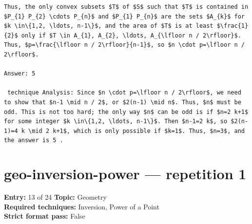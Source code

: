 \documentclass[11pt]{article}
\begin{document}
\begin{lstlisting}[style=modeloutput]
Thus, the only convex subsets $T$ of $S$ such that $T$ is contained in $P_{1} P_{2} \cdots P_{n}$ and $P_{1} P_{n}$ are the sets $A_{k}$ for $k \in\{1,2, \ldots, n-1\}$, and the area of $T$ is at least $\frac{1}{2}$ only if $T \in A_{1}, A_{2}, \ldots, A_{\lfloor n / 2\rfloor}$. Thus, $p=\frac{\lfloor n / 2\rfloor}{n-1}$, so $n \cdot p=\lfloor n / 2\rfloor$.

Answer: 5

 technique Analysis: Since $n \cdot p=\lfloor n / 2\rfloor$, we need to show that $n-1 \mid n / 2$, or $2(n-1) \mid n$. Thus, $n$ must be odd. This is not too hard; the only way $n$ can be odd is if $n=2 k+1$ for some integer $k \in\{1,2, \ldots, n-1\}$. Then $n-1=2 k$, so $2(n-1)=4 k \mid 2 k+1$, which is only possible if $k=1$. Thus, $n=3$, and the answer is 5 .
\end{lstlisting}
\clearpage
\section{geo-inversion-power --- repetition 1}
\begin{minipage}{\textwidth}
\color{metadata}\small\raggedright
\textbf{Entry:} 13 of 24\quad
\textbf{Topic:} Geometry\\[2pt]
\textbf{Required techniques:} Inversion, Power of a Point\\[2pt]
\textbf{Strict format pass:} False
\end{minipage}
\end{document}
